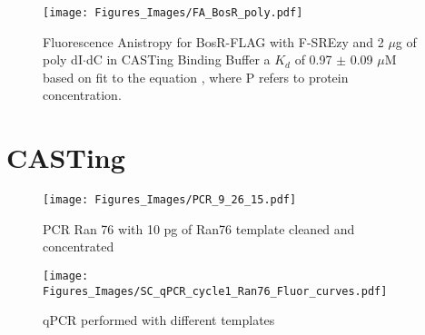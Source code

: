 \documentclass[12pt,twoside]{reedthesis}
\begin{document}
         	\begin{figure}[h]
         		\centering
         		\texttt{[image: Figures\_Images/FA\_BosR\_poly.pdf]}
         		\caption[Determining DNA Activity of BosR-FLAG by Fluorescence Anistropy]{Fluorescence Anistropy for BosR-FLAG with F-SREzy and 2 $\mu$g of poly dI$\cdot$dC in CASTing Binding Buffer  a $K_{d}$ of 0.97 $\pm$ 0.09 $\mu$M based on fit to the equation \FAstdfit , where P refers to protein concentration.}
         		\label{BosRFLAGFApoly}
         	\end{figure}
  
  
  \section*{CASTing} 
  
    		 \begin{figure}[h!tbp]
    		\centering
    		\texttt{[image: Figures\_Images/PCR\_9\_26\_15.pdf]}
    		\caption[PCR to Create Pool of Random DNA]{PCR Ran 76 with 10 pg of Ran76 template cleaned and concentrated}
    		\label{PCRRan76}
    	\end{figure}
 
 
 \begin{figure}[h!tbp]
 	\centering
 	\texttt{[image: Figures\_Images/SC\_qPCR\_cycle1\_Ran76\_Fluor\_curves.pdf]}
 	\caption[qPCR of 1st Cycle of CASTing Fluorescence Curves]{qPCR performed with different templates}
 	\label{qPCRcycle1fluorcurves}
 \end{figure}
\end{document}
